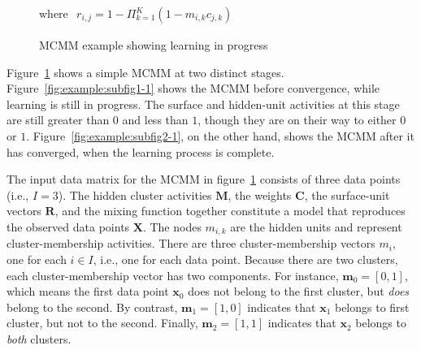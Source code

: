 {\begin{figure}[!b]
\begin{center}
{
 }
 \begin{framed}
 	\centering
 	\small
 	where
 	$\begin{aligned}
 	   r_{i,j} = 1 - \Pi_{k=1}^{K} (1 - m_{i,k}c_{j,k}) 
 	\end{aligned}$
 \end{framed}
 \caption{MCMM example showing learning in progress}
 \label{fig:example-1}
 \end{center}
 \end{figure}

Figure~\ref{fig:example-1} shows a simple MCMM at two distinct stages. Figure~\ref{fig:example:subfig1-1} shows the MCMM before convergence, while learning is still in progress. The surface and hidden-unit activities at this stage are still greater than $0$ and less than $1$, though they are on their way to either $0$ or $1$. Figure~\ref{fig:example:subfig2-1}, on the other hand, shows the MCMM after it has converged, when the learning process is complete.

The input data matrix for the MCMM in figure~\ref{fig:example-1} consists of three data points (i.e., $I = 3$).
The hidden cluster activities $\mathbf{M}$, the weights $\mathbf{C}$, the surface-unit vectors $\mathbf{R}$,
and the mixing function together constitute a model that reproduces the
observed data points $\mathbf{X}$.
The nodes $m_{i,k}$ are the hidden units and represent cluster-membership activities. There are three cluster-membership vectors $m_{i}$, one for each $i \in I$, i.e., one for each data point. Because there are two clusters, each cluster-membership vector has two components. For instance, $\textbf{m}_{0} = [0, 1]$, which means the first data point $\textbf{x}_{0}$ does not belong to the first cluster, but \emph{does} belong to the second. By contrast, $\textbf{m}_{1} = [1,0]$ indicates that $\textbf{x}_{1}$ belongs to first cluster, but not to the second. Finally, $\textbf{m}_{2} = [1,1]$ indicates that  $\textbf{x}_{2}$ belongs to \emph{both} clusters. 

}
